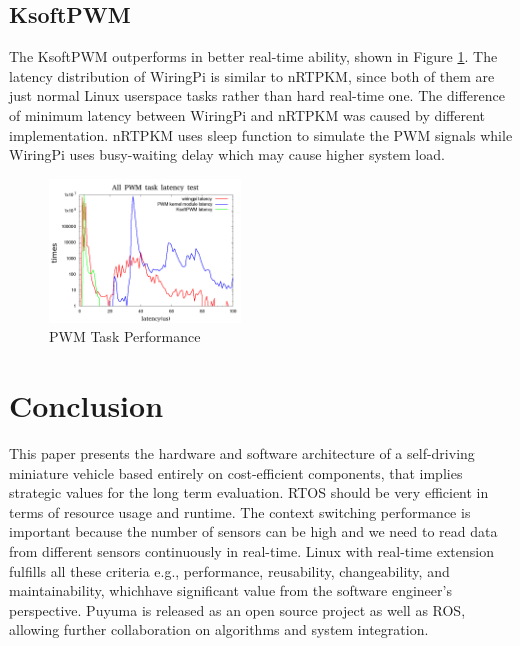 \documentclass[conference]{IEEEtran}
\begin{document}
\subsection{KsoftPWM}

The KsoftPWM outperforms in better real-time ability, shown in Figure \ref{fig:ksoftpwm_perf}. The latency distribution of WiringPi is similar to nRTPKM, since both of them are just normal Linux userspace tasks rather than hard real-time one. The difference of minimum latency between WiringPi and nRTPKM was caused by different implementation. nRTPKM uses sleep function to simulate the PWM signals while WiringPi uses busy-waiting delay which may cause higher system load.

\begin{figure}
	\centering
	\includegraphics[width=2in]{img/ksoftpwm_load.png}
	\caption{PWM Task Performance}
	\label{fig:ksoftpwm_perf}
\end{figure}

\section{Conclusion}

This paper presents the hardware and software architecture of a self-driving miniature vehicle based entirely on cost-efficient components, that implies strategic values for the long term evaluation. RTOS should be very efficient in terms of resource usage and runtime. The context switching performance is important because the number of sensors can be high and we need to read data from different sensors continuously in real-time. Linux with real-time extension  fulfills all these criteria e.g., performance, reusability, changeability, and maintainability, whichhave significant value from the software engineer's perspective. Puyuma is released as an open source project as well as ROS, allowing further collaboration on algorithms and system integration.



\end{document}
